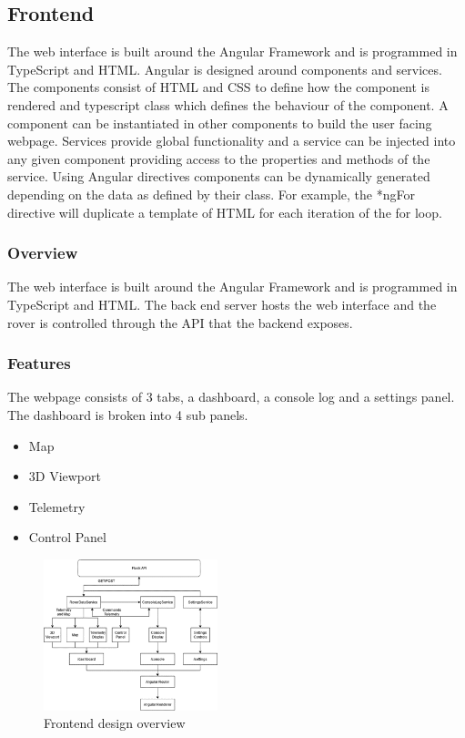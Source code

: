 
\subsection{Frontend}

The web interface is built around the Angular Framework and is programmed in TypeScript and HTML.
Angular is designed around components and services. 
The components consist of HTML and CSS to define how the component is rendered and typescript class which defines the behaviour of the component. 
A component can be instantiated in other components to build the user facing webpage. 
Services provide global functionality and a service can be injected into any given component providing access to the properties and methods of the service. 
Using Angular directives components can be dynamically generated depending on the data as defined by their class. 
For example, the *ngFor directive will duplicate a template of HTML for each iteration of the for loop.

\subsubsection*{Overview}
The web interface is built around the Angular Framework and is programmed in TypeScript 
and HTML. The back end server hosts the web interface and the rover is controlled through the API
that the backend exposes.

\subsubsection*{Features}
The webpage consists of 3 tabs, a dashboard, a console log and a settings panel. 
The dashboard is broken into 4 sub panels.
\begin{itemize}
    \item Map
    \item 3D Viewport
    \item Telemetry
    \item Control Panel
\end{itemize}

\newpage
\begin{figure}
    \centerline{\includegraphics[width=0.45\textwidth]{images/frontend-flow.png}}
    \caption{Frontend design overview}
\end{figure}

